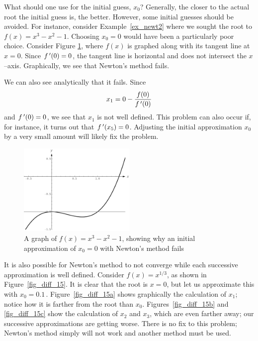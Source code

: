 \ifanalysis

What should one use for the initial guess, $x_0$?  Generally, the closer to the actual root the initial guess is, the better.  However, some initial guesses should be avoided.  For instance, consider Example~\ref{ex_newt2} where we sought the root to $f(x) = x^3-x^2-1$.  Choosing  $x_0=0$ would have been a particularly poor choice. Consider Figure \ref{fig_diff_14}, where $f(x)$ is graphed along with its tangent line at $x=0$. Since $f\,'(0)=0$, the tangent line is horizontal and does not intersect the $x$--axis. Graphically, we see that Newton's method fails. 

We can also see analytically that it fails. Since $$x_1 = 0 -\frac{f(0)}{f\,'(0)}$$ and $f\,'(0)=0$, we see that $x_1$ is not well defined.  This problem can also occur if, for instance, it turns out that $f\,'(x_5)=0$. Adjusting the initial approximation $x_0$ by a very small amount will likely fix the problem.


\begin{figure}[h]
	\begin{center}
			\includegraphics[width=0.5\textwidth]{fig_diff_14}
	\caption{A graph of $f(x) = x^3-x^2-1$, showing why an initial approximation of $x_0=0$ with Newton's method fails}
	\label{fig_diff_14}
	\end{center}
\end{figure}



It is also possible for Newton's method to not converge while each successive approximation is well defined. Consider $f(x) = x^{1/3}$, as shown in Figure~\ref{fig_diff_15}. It is clear that the root is $x=0$, but let us approximate this with $x_0=0.1\,.$ Figure~\ref{fig_diff_15a} shows graphically the calculation of $x_1$; notice how it is farther from the root than $x_0$. Figures~\ref{fig_diff_15b} and \ref{fig_diff_15c} show the calculation of $x_2$ and $x_3$, which are even farther away; our successive approximations are getting worse. There is no fix to this problem; Newton's method simply will not work and another method must be used.

